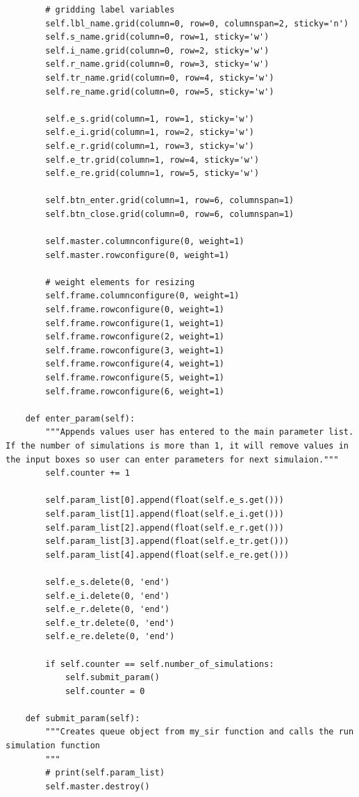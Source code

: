 \documentclass[11pt, a4paper]{article}
\begin{document}
\begin{lstlisting}
        # gridding label variables
        self.lbl_name.grid(column=0, row=0, columnspan=2, sticky='n')
        self.s_name.grid(column=0, row=1, sticky='w')
        self.i_name.grid(column=0, row=2, sticky='w')
        self.r_name.grid(column=0, row=3, sticky='w')
        self.tr_name.grid(column=0, row=4, sticky='w')
        self.re_name.grid(column=0, row=5, sticky='w')

        self.e_s.grid(column=1, row=1, sticky='w')
        self.e_i.grid(column=1, row=2, sticky='w')
        self.e_r.grid(column=1, row=3, sticky='w')
        self.e_tr.grid(column=1, row=4, sticky='w')
        self.e_re.grid(column=1, row=5, sticky='w')

        self.btn_enter.grid(column=1, row=6, columnspan=1)
        self.btn_close.grid(column=0, row=6, columnspan=1)

        self.master.columnconfigure(0, weight=1)
        self.master.rowconfigure(0, weight=1)

        # weight elements for resizing
        self.frame.columnconfigure(0, weight=1)
        self.frame.rowconfigure(0, weight=1)
        self.frame.rowconfigure(1, weight=1)
        self.frame.rowconfigure(2, weight=1)
        self.frame.rowconfigure(3, weight=1)
        self.frame.rowconfigure(4, weight=1)
        self.frame.rowconfigure(5, weight=1)
        self.frame.rowconfigure(6, weight=1)

    def enter_param(self):
        """Appends values user has entered to the main parameter list. If the number of simulations is more than 1, it will remove values in the input boxes so user can enter parameters for next simulaion."""
        self.counter += 1

        self.param_list[0].append(float(self.e_s.get()))
        self.param_list[1].append(float(self.e_i.get()))
        self.param_list[2].append(float(self.e_r.get()))
        self.param_list[3].append(float(self.e_tr.get()))
        self.param_list[4].append(float(self.e_re.get()))

        self.e_s.delete(0, 'end')
        self.e_i.delete(0, 'end')
        self.e_r.delete(0, 'end')
        self.e_tr.delete(0, 'end')
        self.e_re.delete(0, 'end')

        if self.counter == self.number_of_simulations:
            self.submit_param()
            self.counter = 0

    def submit_param(self):
        """Creates queue object from my_sir function and calls the run simulation function
        """
        # print(self.param_list)
        self.master.destroy()


\end{lstlisting}
\end{document}
